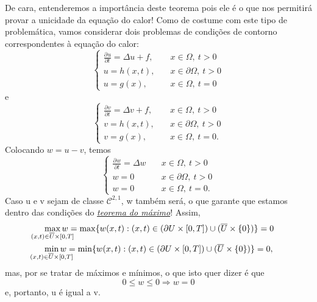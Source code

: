 \documentclass[../pde_notes.tex]{subfiles}
\begin{document}
De cara, entenderemos a importância deste teorema pois ele é o que nos permitirá provar a unicidade da equação do calor! Como de costume com este tipo de problemática, vamos considerar dois problemas de condições de contorno correspondentes à equação do calor:
\[
	\left\{\begin{array}{ll}
		\frac{\partial^{}u}{\partial t^{}}= \Delta u + f, & \quad x\in \Omega,\: t > 0           \\
		u = h(x, t),                                      & \quad x\in \partial \Omega ,\: t > 0 \\
		u = g(x),                                         & \quad x\in \Omega ,\: t = 0
	\end{array}\right.
\]
e
\[
	\left\{\begin{array}{ll}
		\frac{\partial^{}v}{\partial t^{}}=\Delta v + f, & \quad x\in\Omega ,\: t>0            \\
		v = h(x, t),                                     & \quad x\in\partial \Omega ,\: t > 0 \\
		v = g(x),                                        & \quad x\in\Omega ,\: t = 0.
	\end{array}\right.
\]
Colocando \(w=u-v\), temos
\[
	\left\{\begin{array}{ll}
		\frac{\partial^{}w}{\partial t^{}}=\Delta w & \quad x\in\Omega ,\: t>0            \\
		w = 0                                       & \quad x\in\partial \Omega ,\: t > 0 \\
		w=0                                         & \quad x\in\Omega ,\: t = 0.
	\end{array}\right.
\]
Caso u e v sejam de classe \(\mathcal{C}^{2, 1}\), w também será, o que garante que estamos dentro das condições do \hyperlink{strong_maximum}{\textit{teorema do máximo}}! Assim,
\begin{align*}
	 & \max_{\mathclap{(x, t)\in \overline{U}\times [0, T]}} w = \max_{}\{w(x, t):(x, t)\in(\partial U\times [0,T])\cup (\overline{U}\times \{0\})\} = 0  \\
	 & \min_{\mathclap{(x, t)\in \overline{U}\times [0, T]}} w = \min_{}\{w(x, t):(x, t)\in(\partial U\times [0,T])\cup (\overline{U}\times \{0\})\} = 0,
\end{align*}
mas, por se tratar de máximos e mínimos, o que isto quer dizer é que
\[
	0\leq w\leq 0 \Rightarrow w = 0
\]
e, portanto, u é igual a v.
\end{document}
